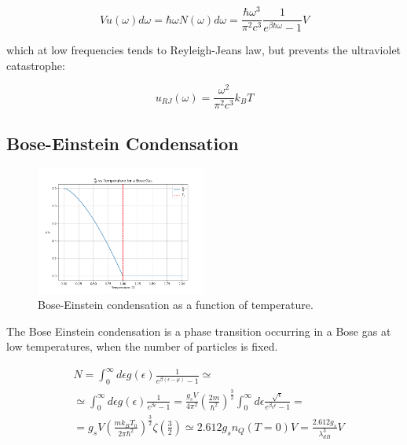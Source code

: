 \documentclass{article}
\begin{document}
\begin{equation}
    V u(\omega)d\omega=\hbar \omega N(\omega)d\omega=\frac{\hbar \omega^3}{\pi^2c^3}\frac{1}{e^{\beta\hbar\omega}-1}V
\end{equation}

which at low frequencies tends to Reyleigh-Jeans law, but prevents the ultraviolet catastrophe:

\begin{equation}
    u_{RJ}(\omega)=\frac{ \omega^2}{\pi^2c^3}k_BT
\end{equation}


\subsection{Bose-Einstein Condensation}

\begin{figure}[h]
    \centering
    \includegraphics[width=0.5\textwidth]{images/statistical-physics/bose-einstein-condensation.png}
    \caption{Bose-Einstein condensation as a function of temperature.}
    \label{fig:bose-einstein-condensation}
\end{figure}

The Bose Einstein condensation is a phase transition occurring in a Bose gas at low temperatures,
when the number of particles is fixed.

\begin{equation}
    \begin{aligned}
         & N=\int_0^\infty d\epsilon g(\epsilon)\frac{1}{e^{\beta(\epsilon-\mu)}-1}\simeq                                                                                                                                  \\
         & \simeq \int_0^\infty d\epsilon g(\epsilon)\frac{1}{e^{\beta \epsilon}-1}=\frac{g_sV}{4\pi^2}\left(\frac{2m}{\hbar^2}\right)^{\frac{3}{2}}\int_0^\infty d\epsilon \frac{\sqrt{\epsilon}}{e^{\beta_0\epsilon}-1}= \\
         & =g_sV\left(\frac{mk_BT_0}{2\pi\hbar^2}\right)^{\frac{3}{2}}\zeta\left(\frac{3}{2}\right)\simeq 2.612 g_s n_Q(T=0) V= \frac{2.612 g_s}{\lambda_{dB}^3}V
    \end{aligned}
\end{equation}
\end{document}
